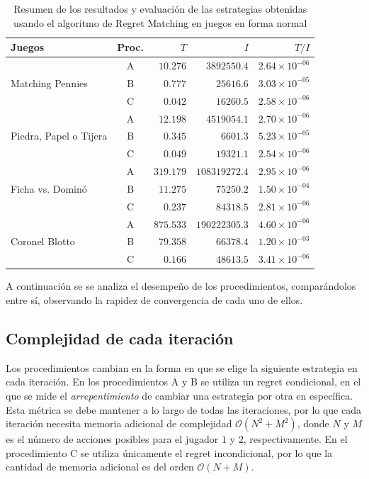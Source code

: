 \begin{table}[htpb]
    \centering
    \begin{tabular}{l | c |r r r}
        \hline
        Juegos & Proc. & $T$ & $I$ & $T/I$ \\ \hline
        \multirow{3}{*}{Matching Pennies}
            & A & $10.276$ & $3892550.4$ & $2.64 {\times} 10^{-06}$ \\
            & B &  $0.777$ &   $25616.6$ & $3.03 {\times} 10^{-05}$ \\
            & C &  $0.042$ &   $16260.5$ & $2.58 {\times} 10^{-06}$ \\ \hline
        \multirow{3}{*}{Piedra, Papel o Tijera}
            & A & $12.198$ & $4519054.1$ & $2.70 {\times} 10^{-06}$ \\
            & B &  $0.345$ &    $6601.3$ & $5.23 {\times} 10^{-05}$ \\
            & C &  $0.049$ &   $19321.1$ & $2.54 {\times} 10^{-06}$ \\ \hline
        \multirow{3}{*}{Ficha vs. Dominó}
            & A & $319.179$ & $108319272.4$ & $2.95 {\times} 10^{-06}$ \\
            & B &  $11.275$ &     $75250.2$ & $1.50 {\times} 10^{-04}$ \\
            & C &   $0.237$ &     $84318.5$ & $2.81 {\times} 10^{-06}$ \\ \hline
        \multirow{3}{*}{Coronel Blotto}
            & A & $875.533$ & $190222305.3$ & $4.60 {\times} 10^{-06}$ \\
            & B &  $79.358$ &     $66378.4$ & $1.20 {\times} 10^{-03}$ \\
            & C &   $0.166$ &     $48613.5$ & $3.41 {\times} 10^{-06}$ \\ \hline
    \end{tabular}
    \caption{Resumen de los resultados y evaluación de las estrategias obtenidas usando el algoritmo de Regret Matching en juegos en forma normal}
    \label{tab:resumen-regret-tiempo-RM}
\end{table}

A continuación se se analiza el desempeño de los procedimientos, comparándolos entre sí, observando la rapidez de convergencia de cada uno de ellos.

\subsection{Complejidad de cada iteración}

Los procedimientos cambian en la forma en que se elige la siguiente estrategia en cada iteración. En los procedimientos A y B se utiliza un regret condicional, en el que se mide el \textit{arrepentimiento} de cambiar una estrategia por otra en específica. Esta métrica se debe mantener a lo largo de todas las iteraciones, por lo que cada iteración necesita memoria adicional de complejidad $\mathcal{O}(N^2 + M^2)$, donde $N$ y $M$ es el número de acciones posibles para el jugador $1$ y $2$, respectivamente. En el procedimiento C se utiliza únicamente el regret incondicional, por lo que la cantidad de memoria adicional es del orden $\mathcal{O}(N + M)$.

